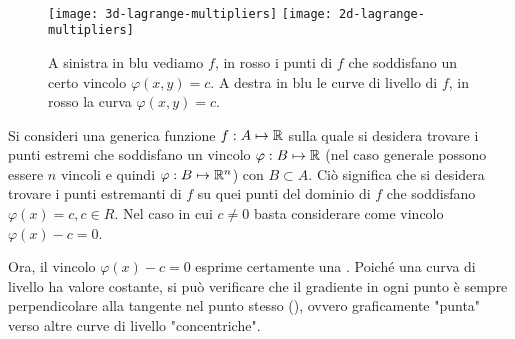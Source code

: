 \newpage %
\begin{observation}~
	\label{obs:concetto_teo_molt_lagr_gen}
	\begin{figure}
		\texttt{[image: 3d-lagrange-multipliers]}
		\texttt{[image: 2d-lagrange-multipliers]}
		\caption{A sinistra in blu vediamo $f$, in rosso i punti di $f$ che soddisfano un certo vincolo $\varphi(x,y) = c$. A destra in blu le curve di livello di $f$, in rosso la curva $\varphi(x,y) = c$.}
	\end{figure}
	Si consideri una generica funzione $f: A \mapsto \mathbb{R}$ sulla quale si desidera trovare i punti estremi che soddisfano un vincolo $\varphi: B \mapsto \mathbb{R}$ (nel caso generale possono essere $n$ vincoli e quindi $\varphi: B \mapsto \mathbb{R}^n$) con $B \subset A$.
	Ciò significa che si desidera trovare i punti estremanti di $f$ su quei punti del dominio di $f$ che soddisfano $\varphi(x) = c, c \in R$. Nel caso in cui $c \neq 0$ basta considerare come vincolo $\varphi(x) - c = 0$.
	
	Ora, il vincolo $\varphi(x) - c = 0$ esprime certamente una .
	Poiché una curva di livello ha valore costante, si può verificare che il gradiente in ogni punto è sempre perpendicolare alla tangente nel punto stesso (), ovvero graficamente "punta" verso altre curve di livello "concentriche".


\end{observation}

